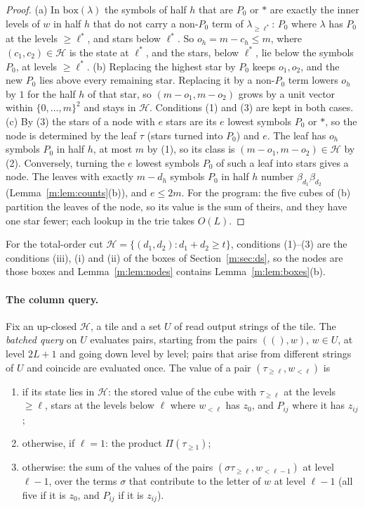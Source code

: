 \documentclass[11pt]{article}
\theoremstyle{definition}
\theoremstyle{remark}
\begin{document}
\begin{proof}
(a) In $\mathrm{box}(\lambda)$ the symbols of half $h$ that are $P_0$ or $\ast$ are exactly the inner levels of $w$ in half $h$ that do not carry a non-$P_0$ term of $\lambda_{\ge\ell^*}$: $P_0$ where $\lambda$ has $P_0$ at the levels $\ge\ell^*$, and stars below $\ell^*$. So $o_h=m-c_h\le m$, where $(c_1,c_2)\in\mathcal H$ is the state at $\ell^*$, and the stars, below $\ell^*$, lie below the symbols $P_0$, at levels $\ge\ell^*$. (b) Replacing the highest star by $P_0$ keeps $o_1,o_2$, and the new $P_0$ lies above every remaining star. Replacing it by a non-$P_0$ term lowers $o_h$ by $1$ for the half $h$ of that star, so $(m-o_1,m-o_2)$ grows by a unit vector within $\{0,\dots,m\}^2$ and stays in $\mathcal H$. Conditions (1) and (3) are kept in both cases. (c) By (3) the stars of a node with $e$ stars are its $e$ lowest symbols $P_0$ or $\ast$, so the node is determined by the leaf $\tau$ (stars turned into $P_0$) and $e$. The leaf has $o_h$ symbols $P_0$ in half $h$, at most $m$ by (1), so its class is $(m-o_1,m-o_2)\in\mathcal H$ by (2). Conversely, turning the $e$ lowest symbols $P_0$ of such a leaf into stars gives a node. The leaves with exactly $m-d_h$ symbols $P_0$ in half $h$ number $\beta_{d_1}\beta_{d_2}$ (Lemma~\ref{m:lem:counts}(b)), and $e\le2m$. For the program: the five cubes of (b) partition the leaves of the node, so its value is the sum of theirs, and they have one star fewer; each lookup in the trie takes $O(L)$.
\end{proof}

For the total-order cut $\mathcal H=\{(d_1,d_2):d_1+d_2\ge t\}$, conditions (1)--(3) are the conditions (iii), (i) and (ii) of the boxes of Section~\ref{m:sec:ds}, so the nodes are those boxes and Lemma~\ref{m:lem:nodes} contains Lemma~\ref{m:lem:boxes}(b).

\paragraph{The column query.} Fix an up-closed $\mathcal H$, a tile and a set $U$ of read output strings of the tile. The \emph{batched query} on $U$ evaluates pairs, starting from the pairs $((),w)$, $w\in U$, at level $2L+1$ and going down level by level; pairs that arise from different strings of $U$ and coincide are evaluated once. The value of a pair $(\tau_{\ge\ell},w_{<\ell})$ is
\begin{enumerate}[label=(\roman*),nosep]
\item if its state lies in $\mathcal H$: the stored value of the cube with $\tau_{\ge\ell}$ at the levels $\ge\ell$, stars at the levels below $\ell$ where $w_{<\ell}$ has $z_0$, and $P_{ij}$ where it has $z_{ij}$;
\item otherwise, if $\ell=1$: the product $\Pi(\tau_{\ge1})$;
\item otherwise: the sum of the values of the pairs $(\sigma\tau_{\ge\ell},w_{<\ell-1})$ at level $\ell-1$, over the terms $\sigma$ that contribute to the letter of $w$ at level $\ell-1$ (all five if it is $z_0$, and $P_{ij}$ if it is $z_{ij}$).
\end{enumerate}
\end{document}
